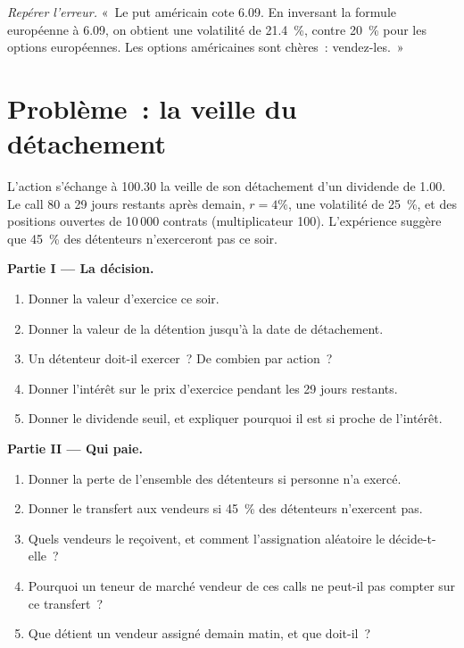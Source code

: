\begin{exercise}[$\star\star\star$]\label{exo:dv:american-options-and-early-exercise:8}
\emph{Repérer l'erreur.} «~Le put américain cote 6.09. En inversant la formule européenne
à 6.09, on obtient une volatilité de 21.4~\%, contre 20~\% pour les options européennes. Les options
américaines sont chères~: vendez-les.~»
\end{exercise}

\section{Problème~: la veille du détachement}

\begin{problem}\label{pb:dv:american-options-and-early-exercise:1}
L'action s'échange à 100.30 la veille de son détachement d'un dividende
de 1.00. Le call 80 a 29 jours restants après demain, $r=4\%$, une volatilité de 25~\%, et des
positions ouvertes de 10\,000 contrats (multiplicateur 100). L'expérience suggère que 45~\% des détenteurs
n'exerceront pas ce soir.

\medskip\noindent\textbf{Partie I --- La décision.}
\begin{enumerate}
\item Donner la valeur d'exercice ce soir.
\item Donner la valeur de la détention jusqu'à la date de détachement.
\item Un détenteur doit-il exercer~? De combien par action~?
\item Donner l'intérêt sur le prix d'exercice pendant les 29 jours restants.
\item Donner le dividende seuil, et expliquer pourquoi il est si proche de l'intérêt.
\end{enumerate}

\medskip\noindent\textbf{Partie II --- Qui paie.}
\begin{enumerate}[resume]
\item Donner la perte de l'ensemble des détenteurs si personne n'a exercé.
\item Donner le transfert aux vendeurs si 45~\% des détenteurs n'exercent pas.
\item Quels vendeurs le reçoivent, et comment l'assignation aléatoire le décide-t-elle~?
\item Pourquoi un teneur de marché vendeur de ces calls ne peut-il pas compter sur ce transfert~?
\item Que détient un vendeur assigné demain matin, et que doit-il~?
\end{enumerate}


\end{problem}
